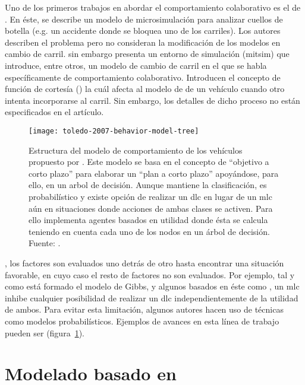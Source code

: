 Uno de los primeros trabajos en abordar el comportamiento colaborativo es el de \cite{Fritzsche1994}. En éste, se describe un modelo de microsimulación para analizar cuellos de botella (e.g. un accidente donde se bloquea uno de los carriles). Los autores describen el problema pero no consideran la modificación de los modelos en cambio de carril. \cite{Yang1996} sin embargo presenta un entorno de simulación (\gls{mitsim}) que introduce, entre otros, un modelo de cambio de carril en el que se habla específicamente de comportamiento colaborativo. Introducen el concepto de función de cortesía (\textit{}) la cuál afecta al modelo de \textit{} de un vehículo cuando otro intenta incorporarse al carril. Sin embargo, los detalles de dicho proceso no están especificados en el artículo.

\begin{figure}
	\texttt{[image: toledo-2007-behavior-model-tree]}
	\caption[Estructura del modelo de comportamiento propuesto por \cite{Toledo2007}]{Estructura del modelo de comportamiento de los vehículos propuesto por \cite{Toledo2007}. Este modelo se basa en el concepto de \enquote{objetivo a corto plazo} para elaborar un \enquote{plan a corto plazo} apoyándose, para ello, en un arbol de decisión. Aunque mantiene la clasificación, es probabilístico y existe opción de realizar un \gls{dlc} en lugar de un \gls{mlc} aún en situaciones donde acciones de ambas clases se activen. Para ello implementa agentes basados en utilidad donde ésta se calcula teniendo en cuenta cada uno de los nodos en un árbol de decisión. Fuente: \cite{Toledo2007}.}
	\label{fig:toledo-2007-behavior-model-tree}
\end{figure}

, los factores son evaluados uno detrás de otro hasta encontrar una situación favorable, en cuyo caso el resto de factores no son evaluados. Por ejemplo, tal y como está formado el modelo de Gibbs, y algunos basados en éste como \cite{Hidas2002}, un \gls{mlc} inhibe cualquier posibilidad de realizar un \gls{dlc} independientemente de la utilidad de ambos. Para evitar esta limitación, algunos autores hacen uso de técnicas como modelos probabilísticos. Ejemplos de avances en esta línea de trabajo pueden ser \cite{Toledo2003, Toledo2007, Wei2000} (figura~\ref{fig:toledo-2007-behavior-model-tree}).

\section{Modelado basado en }

